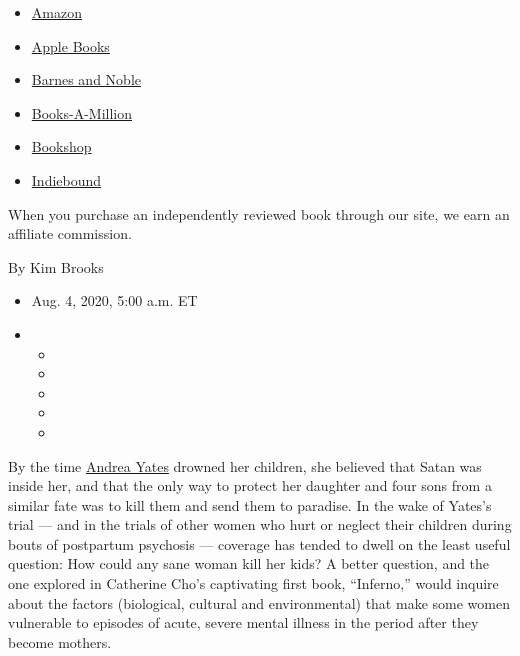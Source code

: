 \begin{itemize}
\tightlist
\item
  \href{https://www.amazon.com/gp/search?index=books\&tag=NYTBSREV-20\&field-keywords=Inferno\%3A+A+Memoir+of+Motherhood+and+Madness+Catherine+Cho}{Amazon}
\item
  \href{https://du-gae-books-dot-nyt-du-prd.appspot.com/buy?title=Inferno\%3A+A+Memoir+of+Motherhood+and+Madness\&author=Catherine+Cho}{Apple
  Books}
\item
  \href{https://www.anrdoezrs.net/click-7990613-11819508?url=https\%3A\%2F\%2Fwww.barnesandnoble.com\%2Fw\%2F\%3Fean\%3D9781250623713}{Barnes
  and Noble}
\item
  \href{https://www.anrdoezrs.net/click-7990613-35140?url=https\%3A\%2F\%2Fwww.booksamillion.com\%2Fp\%2FInferno\%253A\%2BA\%2BMemoir\%2Bof\%2BMotherhood\%2Band\%2BMadness\%2FCatherine\%2BCho\%2F9781250623713}{Books-A-Million}
\item
  \href{https://bookshop.org/a/3546/9781250623713}{Bookshop}
\item
  \href{https://www.indiebound.org/book/9781250623713?aff=NYT}{Indiebound}
\end{itemize}

When you purchase an independently reviewed book through our site, we
earn an affiliate commission.

By Kim Brooks

\begin{itemize}
\item
  Aug. 4, 2020, 5:00 a.m. ET
\item
  \begin{itemize}
  \item
  \item
  \item
  \item
  \item
  \end{itemize}
\end{itemize}

By the time
\href{https://www.nytimes3xbfgragh.onion/2001/09/08/us/despair-plagued-mother-held-in-children-s-deaths.html}{Andrea
Yates} drowned her children, she believed that Satan was inside her, and
that the only way to protect her daughter and four sons from a similar
fate was to kill them and send them to paradise. In the wake of Yates's
trial --- and in the trials of other women who hurt or neglect their
children during bouts of postpartum psychosis --- coverage has tended to
dwell on the least useful question: How could any sane woman kill her
kids? A better question, and the one explored in Catherine Cho's
captivating first book, ``Inferno,'' would inquire about the factors
(biological, cultural and environmental) that make some women vulnerable
to episodes of acute, severe mental illness in the period after they
become mothers.

